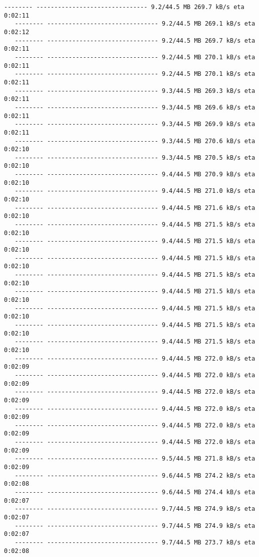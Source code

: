 \documentclass[11pt]{article}
\begin{document}
\begin{Verbatim}[commandchars=\\\{\}]
   -------- ------------------------------- 9.2/44.5 MB 269.7 kB/s eta 0:02:11
   -------- ------------------------------- 9.2/44.5 MB 269.1 kB/s eta 0:02:12
   -------- ------------------------------- 9.2/44.5 MB 269.7 kB/s eta 0:02:11
   -------- ------------------------------- 9.2/44.5 MB 270.1 kB/s eta 0:02:11
   -------- ------------------------------- 9.2/44.5 MB 270.1 kB/s eta 0:02:11
   -------- ------------------------------- 9.3/44.5 MB 269.3 kB/s eta 0:02:11
   -------- ------------------------------- 9.3/44.5 MB 269.6 kB/s eta 0:02:11
   -------- ------------------------------- 9.3/44.5 MB 269.9 kB/s eta 0:02:11
   -------- ------------------------------- 9.3/44.5 MB 270.6 kB/s eta 0:02:10
   -------- ------------------------------- 9.3/44.5 MB 270.5 kB/s eta 0:02:10
   -------- ------------------------------- 9.4/44.5 MB 270.9 kB/s eta 0:02:10
   -------- ------------------------------- 9.4/44.5 MB 271.0 kB/s eta 0:02:10
   -------- ------------------------------- 9.4/44.5 MB 271.6 kB/s eta 0:02:10
   -------- ------------------------------- 9.4/44.5 MB 271.5 kB/s eta 0:02:10
   -------- ------------------------------- 9.4/44.5 MB 271.5 kB/s eta 0:02:10
   -------- ------------------------------- 9.4/44.5 MB 271.5 kB/s eta 0:02:10
   -------- ------------------------------- 9.4/44.5 MB 271.5 kB/s eta 0:02:10
   -------- ------------------------------- 9.4/44.5 MB 271.5 kB/s eta 0:02:10
   -------- ------------------------------- 9.4/44.5 MB 271.5 kB/s eta 0:02:10
   -------- ------------------------------- 9.4/44.5 MB 271.5 kB/s eta 0:02:10
   -------- ------------------------------- 9.4/44.5 MB 271.5 kB/s eta 0:02:10
   -------- ------------------------------- 9.4/44.5 MB 272.0 kB/s eta 0:02:09
   -------- ------------------------------- 9.4/44.5 MB 272.0 kB/s eta 0:02:09
   -------- ------------------------------- 9.4/44.5 MB 272.0 kB/s eta 0:02:09
   -------- ------------------------------- 9.4/44.5 MB 272.0 kB/s eta 0:02:09
   -------- ------------------------------- 9.4/44.5 MB 272.0 kB/s eta 0:02:09
   -------- ------------------------------- 9.4/44.5 MB 272.0 kB/s eta 0:02:09
   -------- ------------------------------- 9.5/44.5 MB 271.8 kB/s eta 0:02:09
   -------- ------------------------------- 9.6/44.5 MB 274.2 kB/s eta 0:02:08
   -------- ------------------------------- 9.6/44.5 MB 274.4 kB/s eta 0:02:07
   -------- ------------------------------- 9.7/44.5 MB 274.9 kB/s eta 0:02:07
   -------- ------------------------------- 9.7/44.5 MB 274.9 kB/s eta 0:02:07
   -------- ------------------------------- 9.7/44.5 MB 273.7 kB/s eta 0:02:08

\end{Verbatim}
\end{document}
